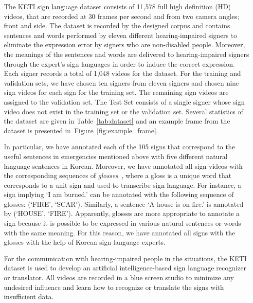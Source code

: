 \documentclass[10pt,twocolumn,letterpaper]{article}
\begin{document}
The KETI sign language dataset consists of 11,578 full high definition (HD) videos, that are recorded at 30 frames per second and from two camera angles; front and side. The dataset is recorded by the designed corpus and contains sentences and words performed by eleven different hearing-impaired signers to eliminate the expression error by signers who are non-disabled people. Moreover, the meanings of the sentences and words are delivered to hearing-impaired signers through the expert's sign languages in order to induce the correct expression.
Each signer records a total of 1,048 videos for the dataset. For the training and validation sets, we have chosen ten signers from eleven signers and chosen nine sign videos for each sign for the training set. The remaining sign videos are assigned to the validation set. The Test Set consists of a single signer whose sign video does not exist in the training set or the validation set. Several statistics of the dataset are given in Table~\ref{tab:dataset} and an example frame from the dataset is presented in~Figure~\ref{fig:example_frame}.

In particular, we have annotated each of the 105 signs that correspond to the useful sentences in emergencies mentioned above with five different natural language sentences in Korean.
Moreover, we have annotated all sign videos with the corresponding sequences of {\em glosses}~\cite{Liddell03}, where a gloss is a unique word that corresponds to a unit sign and used to transcribe sign language. For instance, a sign implying `I am burned.' can be annotated with the following sequence of glosses: (`FIRE', `SCAR'). Similarly, a sentence `A house is on fire.' is annotated by (`HOUSE', `FIRE').
Apparently, glosses are more appropriate to annotate a sign because it is possible to be expressed in various natural sentences or words with the same meaning. For this reason, we have annotated all signs with the glosses with the help of Korean sign language experts. 

For the communication with hearing-impaired people in the situations, the KETI dataset is used to develop an artificial intelligence-based sign language recognizer or translator. All videos are recorded in a blue screen studio to minimize any undesired influence and learn how to recognize or translate the signs with insufficient data.



\end{document}
